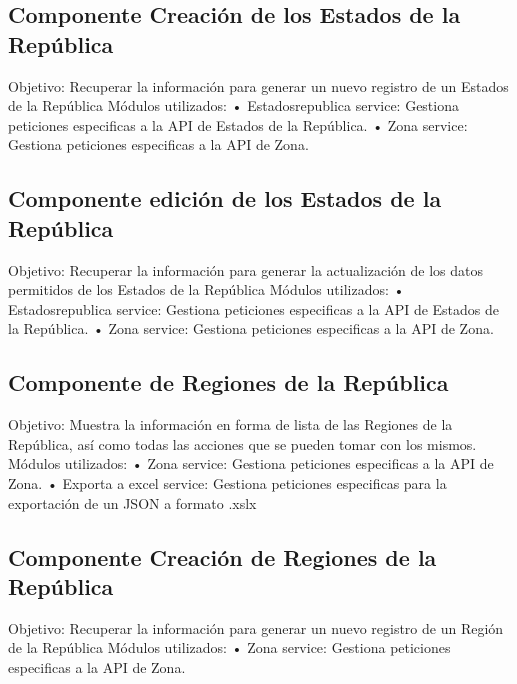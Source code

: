 \subsection{Componente  Creación de los Estados de la República}
Objetivo: Recuperar la información para generar un nuevo registro de un Estados de la República
\newline
Módulos utilizados: 
\newline
• Estadosrepublica service: Gestiona peticiones especificas a la API de Estados de la República.
\newline
• Zona service: Gestiona peticiones especificas a la API de Zona.

\subsection{Componente edición de los Estados de la República}
Objetivo: Recuperar la información para generar la actualización de los datos permitidos de los Estados de la República
\newline
Módulos utilizados: 
\newline
• Estadosrepublica service: Gestiona peticiones especificas a la API de Estados de la República.
\newline
• Zona service: Gestiona peticiones especificas a la API de Zona.



\subsection{Componente de Regiones de la República}
Objetivo: Muestra la información en forma de lista de las Regiones de la República, así como todas las acciones que se pueden tomar con los mismos.
\newline
Módulos utilizados: 
\newline
• Zona service: Gestiona peticiones especificas a la API de Zona.
\newline
• Exporta a excel service: Gestiona peticiones especificas para la exportación de un JSON a formato .xslx

\subsection{Componente  Creación de Regiones de la República}
Objetivo: Recuperar la información para generar un nuevo registro de un Región de la República
\newline
Módulos utilizados: 
\newline
• Zona service: Gestiona peticiones especificas a la API de Zona.

